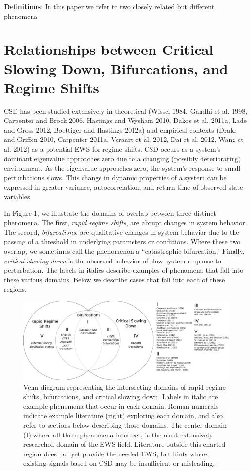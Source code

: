 \documentclass{article}
\begin{document}
\textbf{Definitions}: In this paper we refer to two closely related but
different phenomena

\section{Relationships between Critical Slowing Down, Bifurcations, and
Regime Shifts}

CSD has been studied extensively in theoretical (Wissel 1984, Gandhi et
al. 1998, Carpenter and Brock 2006, Hastings and Wysham 2010, Dakos et
al. 2011a, Lade and Gross 2012, Boettiger and Hastings 2012a) and
empirical contexts (Drake and Griffen 2010, Carpenter 2011a, Veraart et
al. 2012, Dai et al. 2012, Wang et al. 2012) as a potential EWS for
regime shifts. CSD occurs as a system's dominant eigenvalue approaches
zero due to a changing (possibly deteriorating) environment. As the
eigenvalue approaches zero, the system's response to small perturbations
slows. This change in dynamic properties of a system can be expressed in
greater variance, autocorrelation, and return time of observed state
variables.

In Figure 1, we illustrate the domains of overlap between three distinct
phenomena. The first, \emph{rapid regime shifts}, are abrupt changes in
system behavior. The second, \emph{bifurcations}, are qualitative
changes in system behavior due to the passing of a threshold in
underlying parameters or conditions. Where these two overlap, we
sometimes call the phenomenon a ``catastrophic bifurcation.'' Finally,
\emph{critical slowing down} is the observed behavior of slow system
response to perturbation. The labels in italics describe examples of
phenomena that fall into these various domains. Below we describe cases
that fall into each of these regions.

\begin{figure}[htbp]
\centering
\includegraphics{ews-venn.eps}
\caption{Venn diagram representing the intersecting domains of rapid
regime shifts, bifurcations, and critical slowing down. Labels in italic
are example phenomena that occur in each domain. Roman numerals indicate
example literature (right) exploring each domain, and also refer to
sections below describing those domains. The center domain (I) where all
three phenomena intersect, is the most extensively researched domain of
the EWS field. Literature outside this charted region does not yet
provide the needed EWS, but hints where existing signals based on CSD
may be insufficient or misleading.}
\end{figure}
\end{document}
